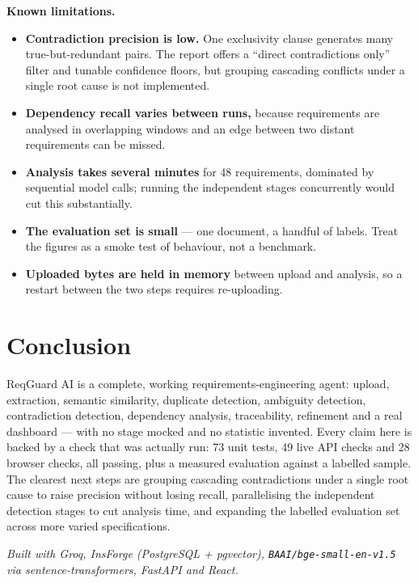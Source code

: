 \textbf{Known limitations.}
\begin{itemize}
  \item \textbf{Contradiction precision is low.} One exclusivity clause generates many true-but-redundant pairs. The report offers a ``direct contradictions only'' filter and tunable confidence floors, but grouping cascading conflicts under a single root cause is not implemented.
  \item \textbf{Dependency recall varies between runs,} because requirements are analysed in overlapping windows and an edge between two distant requirements can be missed.
  \item \textbf{Analysis takes several minutes} for 48 requirements, dominated by sequential model calls; running the independent stages concurrently would cut this substantially.
  \item \textbf{The evaluation set is small} --- one document, a handful of labels. Treat the figures as a smoke test of behaviour, not a benchmark.
  \item \textbf{Uploaded bytes are held in memory} between upload and analysis, so a restart between the two steps requires re-uploading.
\end{itemize}

\section{Conclusion}

ReqGuard AI is a complete, working requirements-engineering agent: upload,
extraction, semantic similarity, duplicate detection, ambiguity detection,
contradiction detection, dependency analysis, traceability, refinement and a
real dashboard --- with no stage mocked and no statistic invented. Every claim
here is backed by a check that was actually run: 73 unit tests, 49 live API
checks and 28 browser checks, all passing, plus a measured evaluation against a
labelled sample. The clearest next steps are grouping cascading contradictions
under a single root cause to raise precision without losing recall,
parallelising the independent detection stages to cut analysis time, and
expanding the labelled evaluation set across more varied specifications.

\vspace{4pt}
{\footnotesize\textit{Built with Groq, InsForge (PostgreSQL + pgvector),
\texttt{BAAI/bge-small-en-v1.5} via sentence-transformers, FastAPI and React.}}


